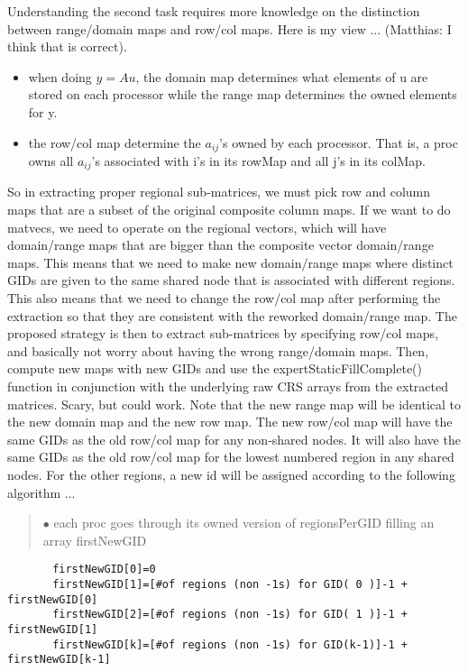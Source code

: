 \documentclass[11pt]{article}
\begin{document}
Understanding the second task requires more knowledge on the distinction
between range/domain maps and row/col maps. Here is my view ... (Matthias: I think that is correct).
\begin{itemize}
   \item when doing $y = A u$, the domain map determines what elements of u are
      stored on each processor while the range map determines the owned elements for y.

   \item the row/col map determine the $a_{ij}$'s owned by each processor. That is,
      a proc owns all $a_{ij}$'s associated with i's in its rowMap and all j's
      in its colMap.
\end{itemize}

So in extracting proper regional sub-matrices, we must pick row and column maps
that are a subset of the original composite column maps.
If we want to do matvecs, we need to operate on the regional vectors, which
will have domain/range maps that are bigger than the composite vector
domain/range maps. This means that we
need to make new domain/range maps where distinct GIDs are given to
the same shared node that is associated with different regions. This also
means that we need to change the row/col map after performing the extraction
so that they are consistent with the reworked domain/range map.
The proposed strategy is then to extract sub-matrices by specifying
row/col maps, and basically not worry about having the wrong range/domain
maps. Then, compute new maps with new GIDs and use the expertStaticFillComplete()
function in conjunction with the underlying raw CRS arrays from the extracted
matrices. Scary, but could work. Note that the new range map will be identical
to the new domain map and the new row map.  The new row/col map will have
the same GIDs as the old row/col map for any non-shared nodes. It will also
have the same GIDs as the old row/col map for the lowest numbered region
in any shared nodes.  For the other regions, a new id will be assigned according
to the following algorithm ...
\begin{quote}
$\bullet$ each proc goes through its owned version of {\sf regionsPerGID}
filling an array {\sf firstNewGID}
\end{quote}
\vspace{-.2in}
\begin{verbatim}
       firstNewGID[0]=0
       firstNewGID[1]=[#of regions (non -1s) for GID( 0 )]-1 + firstNewGID[0]
       firstNewGID[2]=[#of regions (non -1s) for GID( 1 )]-1 + firstNewGID[1]
       firstNewGID[k]=[#of regions (non -1s) for GID(k-1)]-1 + firstNewGID[k-1]
\end{verbatim}
\end{document}

